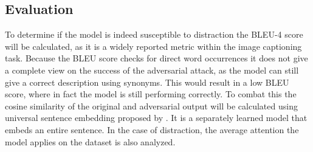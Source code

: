 \subsection{Evaluation}
To determine if the model is indeed susceptible to distraction the BLEU-4 score \cite{papineni_roukos_ward_zhu_2001} will be calculated, as it is a widely reported metric within the image captioning task. Because the BLEU score checks for direct word occurrences it does not give a complete view on the success of the adversarial attack, as the model can still give a correct description using synonyms. This would result in a low BLEU score, where in fact the model is still performing correctly. To combat this the cosine similarity of the original and adversarial output will be calculated using universal sentence embedding proposed by \citeauthor{DBLP:journals/corr/abs-1803-11175}. It is a separately learned model that embeds an entire sentence.
In the case of distraction, the average attention the model applies on the dataset is also analyzed.
